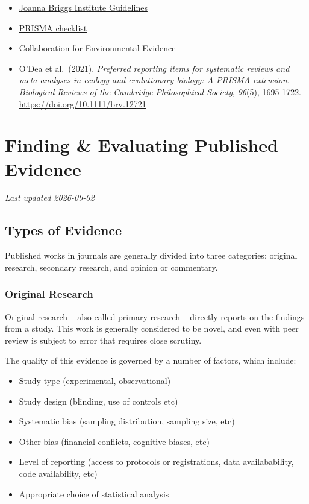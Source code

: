 \documentclass[
]{book}
\providecommand{\tightlist}{%
  \setlength{\itemsep}{0pt}\setlength{\parskip}{0pt}}
\begin{document}
\begin{itemize}
\tightlist
\item
  \href{https://jbi-global-wiki.refined.site/space/MANUAL/4688650/Chapter+1\%3A+JBI+Systematic+Reviews}{Joanna Briggs Institute Guidelines}
\item
  \href{https://www.prisma-statement.org/prisma-2020-checklist}{PRISMA checklist}
\item
  \href{https://environmentalevidence.org/information-for-authors/}{Collaboration for Environmental Evidence}
\item
  O'Dea et al.~(2021). \emph{Preferred reporting items for systematic reviews and meta‐analyses in ecology and evolutionary biology: A PRISMA extension}. \emph{Biological Reviews of the Cambridge Philosophical Society}, \emph{96}(5), 1695-1722. \url{https://doi.org/10.1111/brv.12721}
\end{itemize}

\chapter{Finding \& Evaluating Published Evidence}\label{finding-evaluating-published-evidence}

\emph{Last updated 2026-09-02}

\section{Types of Evidence}\label{types-of-evidence}

Published works in journals are generally divided into three categories: original research, secondary research, and opinion or commentary.

\subsection{Original Research}\label{original-research}

Original research -- also called primary research -- directly reports on the findings from a study. This work is generally considered to be novel, and even with peer review is subject to error that requires close scrutiny.

The quality of this evidence is governed by a number of factors, which include:

\begin{itemize}
\tightlist
\item
  Study type (experimental, observational)
\item
  Study design (blinding, use of controls etc)
\item
  Systematic bias (sampling distribution, sampling size, etc)
\item
  Other bias (financial conflicts, cognitive biases, etc)
\item
  Level of reporting (access to protocols or registrations, data availabability, code availability, etc)
\item
  Appropriate choice of statistical analysis
\end{itemize}
\end{document}
